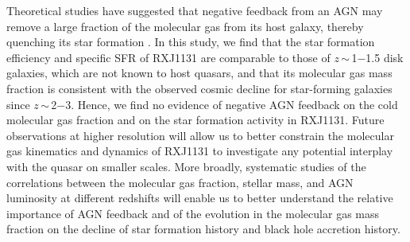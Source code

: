 \documentclass[]{emulateapj}
\newcommand{\ssim}{\,$\sim$\,}
\begin{document}
Theoretical studies have suggested that negative feedback from an AGN may remove a
large fraction of the molecular gas from its host galaxy, thereby quenching its star formation \mbox{\citep[e.g., ][]{DiMatteo05a}}.
In this study, we find that the star formation efficiency and specific SFR of RXJ1131 are comparable to those of
$z$\ssim1$-$1.5 disk galaxies, which are not known to host quasars, and that its
molecular gas mass fraction is consistent with the observed cosmic decline for star-forming
galaxies since $z$\ssim2$-$3.
Hence, we find no evidence of negative AGN feedback on the cold molecular gas fraction
and on the star formation activity in RXJ1131.
Future observations at higher resolution will allow us to better constrain the molecular gas kinematics and dynamics of
RXJ1131 to investigate any potential interplay with the quasar on smaller scales.
More broadly, systematic studies of the correlations between the molecular gas fraction, stellar mass, and AGN luminosity
at different redshifts
will enable us to better understand the relative importance of AGN feedback and of the
evolution in the molecular gas mass fraction on the decline of star formation history and black hole accretion history.

\acknowledgments
\end{document}
